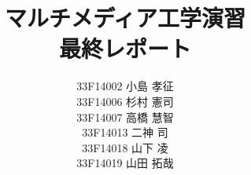 \documentclass[a4j]{jreport}
\begin{document}
\title{マルチメディア工学演習\\最終レポート}
\author{
  33F14002 小島 孝征\\
  33F14006 杉村 憲司\\
  33F14007 高橋 慧智\\
  33F14013 二神 司\\
  33F14018 山下 凌\\
  33F14019 山田 拓哉
}

\maketitle

\tableofcontents

















\end{document}
